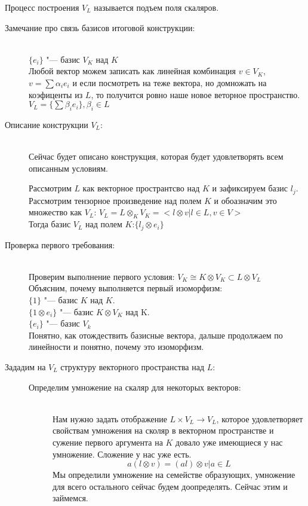 \begin{description}
\begin{Def}
Процесс построения $V_L$ называется подъем поля скаляров.
\end{Def}
\begin{description}
    \item[Замечание про связь базисов итоговой конструкции:] \hfill \\
$\{e_i\}$ "--- базис $V_K$ над $K$\\
Любой вектор можем записать как линейная комбинация $v \in V_K$, 
$v = \sum \alpha_i e_i$ и если посмотреть на теже вектора, но домножать на 
коэфиценты из $L$, то получится ровно наше новое веторное пространство. 
$V_L  = \{\sum \beta_ie_i\}, \beta_i \in L$\\

    \item[Описание конструкции $V_L$:] \hfill \\
Сейчас будет описано конструкция, которая будет удовлетворять всем 
описанным условиям.

Рассмотрим $L$ как векторное пространтсво над $K$ и зафиксируем базис $l_j$.\\

Рассмотрим тензорное произведение над полем $K$ и обоазначим это множество как $V_L$:
$V_L = L \otimes_{K} V_K = < l \otimes v | l \in L, v \in V >$\\

Тогда базис $V_L$ над полем $K$:$\{l_j \otimes e_i\}$\\

   \item[Проверка первого требования:]\hfill \\
Проверим выполнение первого условия: $V_K \cong K \otimes V_K \subset L \otimes V_L$\\
Объясним, почему выполняется первый изоморфизм:\\
$\{1\}$ "--- базис $K$ над $K$.\\
$\{1 \otimes e_i\}$ "--- базис $K \otimes V_K$ над K.\\
$\{e_i\}$ "--- базис $V_k$\\
Понятно, как отождествить базисные вектора, дальше продолжаем по линейности и понятно, почему это 
изоморфизм.\\

    \item[Зададим на $V_L$ структуру векторного пространства над $L$:] \hfill
    \begin{description}
    \item[Определим умножение на скаляр для некоторых векторов:] \hfill \\
Нам нужно задать отображение $L \times V_L \to V_L$, которое удовлетворяет свойствам умножения на сколяр в 
векторном пространстве и сужение первого аргумента на $K$ довало уже имеющиеся у нас умножение. Сложение у нас уже есть.
$$a(l \otimes v) = (al) \otimes v | a \in L $$
Мы определили умножение на семействе образующих, умножение для всего остального сейчас будем доопределять.
Сейчас этим и займемся.


\end{description}
\end{description}
\end{description}
